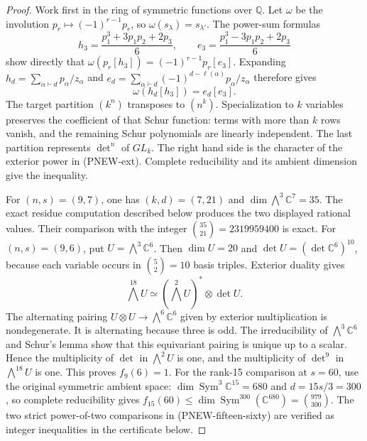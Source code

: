 \begin{proof}
Work first in the ring of symmetric functions over $\mathbb Q$.
Let $\omega$ be the involution $p_r\mapsto(-1)^{r-1}p_r$,
so $\omega(s_\lambda)=s_{\lambda'}$.  The power-sum formulas
\[
 h_3=\frac{p_1^3+3p_1p_2+2p_3}{6},\qquad
 e_3=\frac{p_1^3-3p_1p_2+2p_3}{6}
\]
show directly that
$\omega(p_r[h_3])=(-1)^{r-1}p_r[e_3]$.
Expanding $h_d=\sum_{\alpha\vdash d}p_\alpha/z_\alpha$
and $e_d=\sum_{\alpha\vdash d}(-1)^{d-\ell(\alpha)}
p_\alpha/z_\alpha$ therefore gives
\[
                         \omega(h_d[h_3])=e_d[e_3].
\]
The target partition $(k^n)$ transposes to $(n^k)$.
Specialization to $k$ variables preserves the coefficient of that
Schur function: terms with more than $k$ rows vanish, and the
remaining Schur polynomials are linearly independent.  The last
partition represents $\det^n$ of $GL_k$.  The right hand side is
the character of the exterior power in (PNEW-ext).  Complete
reducibility and its ambient dimension give the inequality.

For $(n,s)=(9,7)$, one has $(k,d)=(7,21)$ and
$\dim\bigwedge^3\mathbb C^7=35$.  The exact residue computation
described below produces the two displayed rational values.  Their
comparison with the integer $\binom{35}{21}=2319959400$ is exact.
For $(n,s)=(9,6)$, put $U=\bigwedge^3\mathbb C^6$.
Then $\dim U=20$ and $\det U=(\det\mathbb C^6)^{10}$,
because each variable occurs in $\binom52=10$ basis triples.
Exterior duality gives
\[
 \bigwedge^{18}U\simeq(\bigwedge^2 U)^*\otimes\det U.
\]
The alternating pairing $U\otimes U\to\bigwedge^6\mathbb C^6$
given by exterior multiplication is nondegenerate.  It is alternating
because three is odd.  The irreducibility of $\bigwedge^3\mathbb C^6$
and Schur's lemma show that this equivariant pairing is unique up
to a scalar.  Hence the multiplicity of $\det$ in $\bigwedge^2U$
is one, and the multiplicity of $\det^9$ in $\bigwedge^{18}U$
is one.  This proves $f_9(6)=1$.
For the rank-15 comparison at $s=60$, use the original symmetric
ambient space: $\dim\operatorname{Sym}^3\mathbb C^{15}=680$ and
$d=15s/3=300$, so complete reducibility gives
$f_{15}(60)\le\dim\operatorname{Sym}^{300}(\mathbb C^{680})
=\binom{979}{300}$.  The two strict power-of-two comparisons in
(PNEW-fifteen-sixty) are verified as integer inequalities in the
certificate below.
\end{proof}

